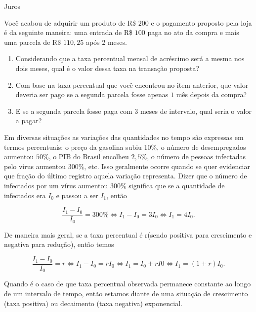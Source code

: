 \begin{task}{Juros}


Você acabou de adquirir um produto de R\$ $200$ e o pagamento proposto pela loja é da seguinte maneira: uma entrada de R\$ $100$ paga no ato da compra e mais uma parcela de  R\$ $110{,}25$ após 2 meses.

\begin{enumerate}

\item{}
Considerando que a taxa percentual mensal de acréscimo será a mesma nos dois meses, qual é o valor dessa taxa na transação proposta?

\item{}
Com base na taxa percentual que você encontrou no item anterior, que valor deveria ser pago se a segunda parcela fosse apenas $1$ mês depois da compra?

\item{}
E se a segunda parcela fosse paga com $3$ meses de intervalo, qual seria o valor a pagar? 

\end{enumerate}

\end{task}


Em diversas situações as variações das quantidades no tempo são expressas em termos percentuais: o preço da gasolina subiu $10\%$, o número de desempregados aumentou $50\%$, o PIB do Brasil encolheu $2{,}5$\%, o número de pessoas infectadas pelo vírus aumentou $300\%$, etc. Isso geralmente ocorre quando se quer evidenciar que fração do último registro aquela variação representa. Dizer que o número de infectados por um vírus aumentou $300\%$ significa que se a quantidade de infectados era $I_{0}$ e passou a ser $I_{1}$, então

\[
\dfrac{I_{1}-I_{0}}{I_{0}}=300\% \iff I_{1}-I_{0}=3I_{0} \iff I_{1}=4I_{0}.
\]

De maneira mais geral, se a taxa percentual é r(sendo positiva para crescimento e negativa para redução), então temos

\[
\dfrac{I_{1}-I_{0}}{I_{0}}=r \iff I_{1}-I_{0}=rI_{0} \iff I_{1}=I_{0}+rI{0} \iff I_{1}=(1+r)I_{0}.
\]

Quando é o caso de que taxa percentual observada permanece constante ao longo de um intervalo de tempo, então estamos diante de uma situação de crescimento (taxa positiva) ou decaimento (taxa negativa) exponencial.

